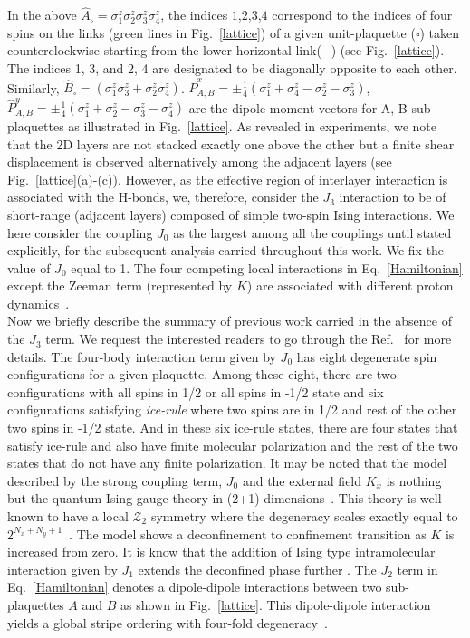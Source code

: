 In the above $\hat{A}_{\square} = \sigma_{1}^{z}\sigma_{2}^{z}\sigma_{3}^{z}\sigma_{4}^{z}$, the indices $1$,$2$,$3$,$4$ correspond to the indices of four spins on the links (green lines in Fig.~\ref{lattice}) of a given unit-plaquette ($\square$) taken counterclockwise starting from the lower horizontal link($-$) (see Fig.~\ref{lattice}). The indices 1, 3, and 2, 4 are designated to be diagonally opposite to each other.  Similarly, $\hat{B}_{\square}=(\sigma_{1}^{z}\sigma_{3}^{z} + \sigma_{2}^{z}\sigma_{4}^{z})$. $\hat{P}_{A,B}^x=\pm\frac{1}{4}(\sigma^z_{1}+\sigma^z_{4}-\sigma^z_{2}-\sigma^z_{3})$, $\hat{P}_{A,B}^y=\pm\frac{1}{4}(\sigma^z_{1}+\sigma^z_{2}-\sigma^z_{3}-\sigma^z_{4})$ are the dipole-moment vectors for A, B sub-plaquettes as illustrated in Fig.~\ref{lattice}. As revealed in experiments, we note that the 2D layers are not stacked exactly one above the other but a finite shear displacement is observed alternatively among the adjacent layers (see Fig.~\ref{lattice}(a)-(c)). However, as the effective region  of interlayer interaction is associated with the H-bonds, we, therefore, consider the $J_3$ interaction to be of short-range (adjacent layers) composed of simple two-spin Ising interactions. We here consider the coupling $J_0$ as the largest among all the couplings  until stated explicitly, for the subsequent analysis carried throughout this work. We fix the value of $J_0$ equal to 1.  The four competing local interactions in Eq.~\eqref{Hamiltonian} except the Zeeman term (represented by $K$) are associated with different proton dynamics~\cite{vijigiri2018classical}. \\
\indent
Now we briefly describe the summary of previous work carried in the absence of the $J_3$ term. We request the interested readers to go through the Ref.~ for more details. The four-body interaction term given by $J_0$ has eight degenerate spin configurations for a given plaquette. Among these eight, there are two configurations with all spins in 1/2 or all spins in -1/2 state and six configurations satisfying  \textit{ice-rule} where two spins are in 1/2 and rest of the other two spins in -1/2 state.  And in these six ice-rule states, there are four states that satisfy ice-rule and also have finite molecular polarization and the rest of the two states that do not have any finite polarization. It may be noted that the model described by the strong coupling term, $J_0$ and the external field $K_x$ is nothing but the quantum Ising gauge theory in (2+1) dimensions~\cite{chern2014gauge}. This theory is well-known to have a local $\mathcal{Z}_2$ symmetry where the degeneracy scales exactly equal to $2^{N_x+N_y+1}$~\cite{vijigiri2018classical}. The model shows a deconfinement to confinement transition as $K$ is increased from zero.  It is know that the addition of Ising type intramolecular interaction given by $J_1$ extends the deconfined phase further \cite{vijigiri2018classical}. The $J_2$ term in Eq.~\eqref{Hamiltonian} denotes a dipole-dipole interactions between two sub-plaquettes $A$ and $B$ as shown in Fig.~\ref{lattice}. This dipole-dipole interaction yields a global stripe ordering with four-fold degeneracy~\cite{vijigiri2018classical}. \\
